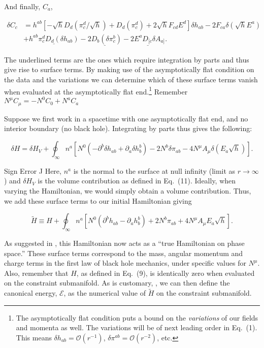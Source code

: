\documentclass[titlepage]{article}
\def\beq{\begin{equation}}
\def\eeq{\end{equation}}
\begin{document}
\noindent
And finally, $C_a$,

\beq
\begin{aligned}
\delta C_c &= h^{ab}\left[ - \sqrt{h}D_d\left(\pi_c^d /\sqrt{h}\right) + D_d\left(\pi_c^d\right) + 2 \sqrt{h}F_{cd}E^d  \right]\delta h_{ab} - 2 F_{ca}\delta\left(\sqrt{h} E^a \right) \\ &+ \underline{ h^{ab}  \pi_c^d D_d \left( \delta h_{ab} \right)  } -\underline{2D_b\left(\delta \pi_c^b\right)} - \underline{2E^aD_{[c} \delta A_{a]}}   .
\end{aligned}
\eeq


The underlined terms are the ones which require integration by parts and thus give rise to surface terms.  By making use of the asymptotically flat condition on the data and the variations we can determine which of these surface terms vanish when evaluated at the asymptotically flat end.\footnote{The asymptotically flat condition puts a bound on the \emph{variations} of our fields and momenta as well.  The variations will be of next leading order in Eq.\ (1).  This means $\delta h_{ab} = \mathcal{O}\left(r^{-1}\right)$, $\delta\pi^{ab} = \mathcal{O}\left(r^{-2}\right)  $, etc.}  Remember $N^\mu C_\mu = -N^0 C_0 + N^a C_a$

Suppose we first work in a spacetime with one asymptotically flat end, and no interior boundary (no black hole).  Integrating by parts thus gives the following:

\beq
\delta H = \delta H_V + \oint_{\infty}n^a\left[N^0\left( - \partial^b\delta h_{ab} + \partial_a\delta h^b_b \right) - 2 N^b \delta \pi_{ab} - 4 N^\mu A_\mu \delta\left(E_a \sqrt{h}  \right) \right] .
\eeq

Sign Error ^^

\noindent
Here, $n^a$ is the normal to the surface at null infinity (limit as $r\rightarrow \infty$) and $\delta H_V$ is the volume contribution as defined in Eq.\ (11).  Ideally, when varying the Hamiltonian, we would simply obtain a volume contribution.  Thus, we add these surface terms to our initial Hamiltonian giving

\beq
\tilde H \equiv H + \oint_{\infty}n^a\left[N^0\left( \partial^b h_{ab} - \partial_a h^b_b \right) + 2 N^b  \pi_{ab} + 4 N^\mu A_\mu E_a \sqrt{h} \right] .
\eeq

\noindent
As suggested in \cite{wald1993first}, this Hamiltonian now acts as a ``true Hamiltonian on phase space.''  These surface terms correspond to the mass, angular momentum and charge terms in the first law of black hole mechanics, under specific values for $N^\mu$.  Also, remember that $H$, as defined in Eq.\ (9), is identically zero when evaluated on the constraint submanifold.  As is customary, \cite{sudarskyExtrema92}, we can then define the canonical energy, $\mathcal{E}$, as the numerical value of $\tilde H $ on the constraint submanifold.
\end{document}
